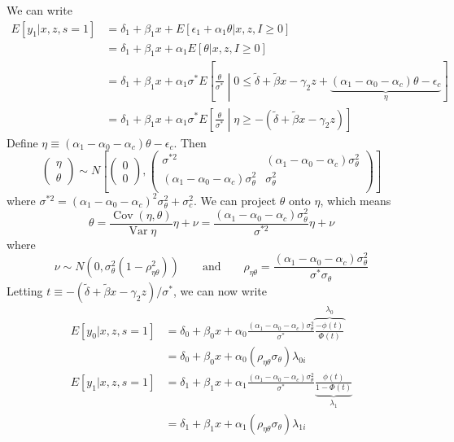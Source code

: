 \documentclass[11pt,letterpaper]{article}
\DeclareMathOperator{\Var}{Var}
\DeclareMathOperator{\Cov}{Cov}
\begin{document}
We can write
\begin{align*}
E[y_1 | x,z,s=1] 
&= \delta_1 + \beta_1 x + E[\epsilon_1 + \alpha_1\theta | x,z, I\geq 0] \\
&= \delta_1 + \beta_1 x + \alpha_1 E[\theta | x,z, I\geq 0] \\
&= \delta_1 + \beta_1 x + \alpha_1\sigma^* E\left[\frac{\theta}{\sigma^*} \middle|0 \leq \widetilde \delta + \widetilde \beta x - \gamma_2 z + \underbrace{(\alpha_1 - \alpha_0 - \alpha_c)\theta - \epsilon_c}_\eta  \right] \\
&= \delta_1 + \beta_1 x + \alpha_1\sigma^* E\left[\frac{\theta}{\sigma^*} \middle| \eta \geq - \left( \widetilde \delta + \widetilde \beta x - \gamma_2 z  \right) \right]
\end{align*}
Define $\eta \equiv (\alpha_1 - \alpha_0 - \alpha_c)\theta - \epsilon_c$. Then 
\[
\begin{pmatrix} \eta \\ \theta \end{pmatrix} 
\sim N
\left[ 
	\begin{pmatrix} 0 \\ 0  \end{pmatrix}, 
	\begin{pmatrix} 
		\sigma^{*2}     & (\alpha_1 - \alpha_0 - \alpha_c)\sigma^2_\theta \\
		(\alpha_1 - \alpha_0 - \alpha_c)\sigma^2_\theta & \sigma^2_\theta \\
	\end{pmatrix}
\right] 
\]
where $\sigma^{*2} = (\alpha_1 - \alpha_0 - \alpha_c)^2\sigma^2_\theta + \sigma^2_c$. We can project $\theta$ onto $\eta$, which means
\[
\theta = \frac{\Cov(\eta,\theta)}{\Var \eta } \eta + \nu = \frac{(\alpha_1 - \alpha_0 - \alpha_c)\sigma^2_\theta}{\sigma^{*2}}\eta + \nu
\]
where
\[
\nu \sim N\left( 0, \sigma^2_\theta \left( 1- \rho_{\eta\theta}^2\right)\right)
\qquad\text{and} \qquad
\rho_{\eta\theta} = \frac{(\alpha_1 - \alpha_0 - \alpha_c)\sigma^2_\theta}{\sigma^{*}\sigma_\theta}
\]
Letting $t \equiv -(\widetilde \delta + \widetilde \beta x - \gamma_2 z)/\sigma^* $, we can now write
\begin{align*}
E[y_0 | x,z,s=1] 
&= \delta_0 + \beta_0 x + \alpha_0 \frac{(\alpha_1 - \alpha_0 - \alpha_c)\sigma^2_\theta}{\sigma^*} \overbrace{\frac{-\phi(t)}{\Phi(t)}}^{\lambda_0} \\
&= \delta_0 + \beta_0 x + \alpha_0 \left( \rho_{\eta\theta}\sigma_\theta \right) \lambda_{0i} \\
E[y_1 | x,z,s=1] 
&= \delta_1 + \beta_1 x + \alpha_1 \frac{(\alpha_1 - \alpha_0 - \alpha_c)\sigma^2_\theta}{\sigma^*} \underbrace{\frac{\phi(t)}{1-\Phi(t)}}_{\lambda_1} \\
&= \delta_1 + \beta_1 x + \alpha_1 \left( \rho_{\eta\theta}\sigma_\theta \right) \lambda_{1i} \\
\end{align*}
\end{document}
